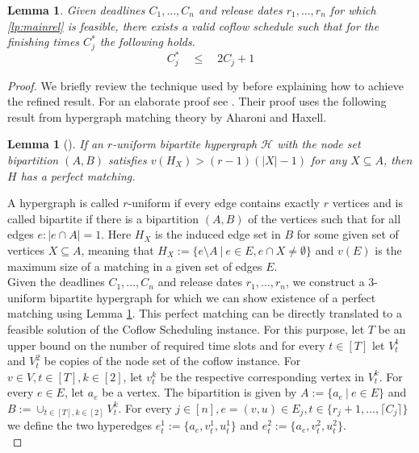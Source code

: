 \documentclass[11pt]{article}
\newtheorem{lemma}[theorem]{Lemma}
\begin{document}
\begin{lemma}\label{lemma:hypergraphexist}
Given deadlines $C_1,\dotsc,C_n$ and release dates $r_1,\dotsc,r_n$ for which \ref{lp:mainrel} is feasible, there exists a valid coflow schedule such that for the finishing times $C^*_j$ the following holds.
\begin{equation*}
    C^*_j \quad \le \quad 2C_j + 1
\end{equation*}
\end{lemma}
\begin{proof}

We briefly review the technique used by \cite{fukunaga22} before explaining how to achieve the refined result. For an elaborate proof see \cite{fukunaga22}. Their proof uses the following result from hypergraph matching theory by Aharoni and Haxell.

\begin{lemma}[\cite{Aharoni2000}]\label{lemma:hypergraphmatching}
    If an $r$-uniform bipartite hypergraph $\mathcal{H}$ with the node set bipartition $(A,B)$ satisfies $v(H_X) > (r-1)(|X|-1)$ for any $X \subseteq A$, then $H$ has a perfect matching.
\end{lemma}

A hypergraph is called $r$-uniform if every edge contains exactly $r$ vertices and is called bipartite if there is a bipartition $(A,B)$ of the vertices such that for all edges $e: |e \cap A| = 1$. Here $H_X$ is the induced edge set in $B$ for some given set of vertices $X \subseteq A$, meaning that $H_X := \{e \setminus A\ |\ e \in E , e \cap X \neq \emptyset\}$ and $v(E)$ is the maximum size of a matching in a given set of edges $E$.\\

Given the deadlines $C_1,...,C_n$ and release dates $r_1,...,r_n$, we construct a $3$-uniform bipartite hypergraph for which we can show existence of a perfect matching using Lemma \ref{lemma:hypergraphmatching}. This perfect matching can be directly translated to a feasible solution of the Coflow Scheduling instance. For this purpose, let $T$ be an upper bound on the number of required time slots and for every $t \in [T]$ let $V^1_t$ and $V^2_t$ be copies of the node set of the coflow instance. For $v \in V, t\in [T],k \in [2]$, let $v_t^k$ be the respective corresponding vertex in $V_t^k$. For every $e \in E$, let $a_e$ be a vertex. The bipartition is given by $A := \{a_e\ |\ e \in E\}$ and $B:= \cup_{t \in [T], k \in [2]}V^k_t$. For every $j \in [n], e=(v,u) \in E_j, t \in \{r_j+1,...,\lceil C_j \rceil\}$ we define the two hyperedges $e_t^1 := \{a_e, v_t^1, u_t^1\}$ and $e_t^2 := \{a_e, v_t^2, u_t^2\}$.\\


\end{proof}
\end{document}
